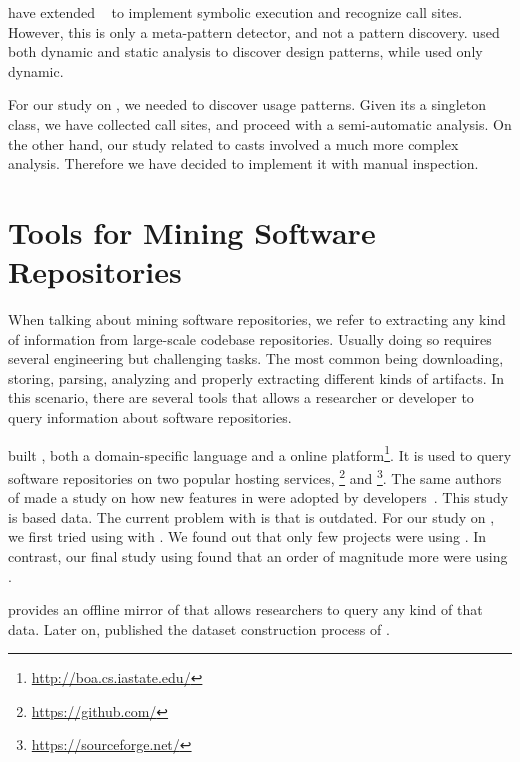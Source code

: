 \cite{posnett_thex:_2010} have extended \asm{}~\cite{bruneton_asm:_2002,kuleshov_using_2007} to implement symbolic execution and recognize call sites.
However, this is only a meta-pattern detector, and not a pattern discovery.
\cite{hu_dynamic_2008} used both dynamic and static analysis to discover design patterns, while \cite{arcelli_design_2008} used only dynamic.

For our study on \smu{}, we needed to discover usage patterns.
Given its a singleton class, we have collected call sites,
and proceed with a semi-automatic analysis.
On the other hand, our study related to casts involved a much more complex analysis.
Therefore we have decided to implement it with manual inspection.


\section{Tools for Mining Software Repositories}

\label{sec:msr}

When talking about mining software repositories, we refer to extracting any kind of information from large-scale codebase repositories.
Usually doing so requires several engineering but challenging tasks.
The most common being downloading, storing, parsing, analyzing and properly extracting different kinds of artifacts.
In this scenario, there are several tools that allows a researcher or developer to query information about software repositories.

\cite{dyer_boa:_2013,dyer_declarative_2013} built \boa{}, both a domain-specific language and a online platform\footnote{\url{http://boa.cs.iastate.edu/}}.
It is used to query software repositories on two popular hosting services, \github{}\footnote{\url{https://github.com/}} and \sourceforge{}\footnote{\url{https://sourceforge.net/}}.
The same authors of \boa{} made a study on how new features in \java{} were adopted by developers~\cite{dyer_mining_2014}.
This study is based \sourceforge{} data.
The current problem with \sourceforge{} is that is outdated.
For our study on \smu{}, we first tried using \boa{} with \sourceforge{}.
We found out that only few projects were using \smu{}.
In contrast, our final study using \maven{} found that an order of magnitude more were using \smu{}.

\cite{gousios_ghtorent_2013}
provides an offline mirror of \github{} that allows researchers to query any kind of that data.
Later on, \cite{gousios_lean_2014} published the dataset construction process of \github{}.

